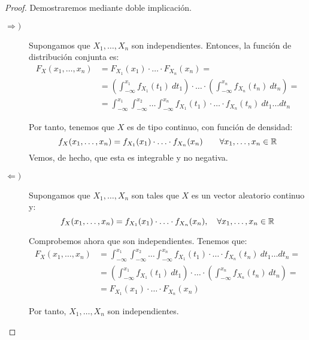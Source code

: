 \begin{proof}
    Demostraremos mediante doble implicación.
    \begin{description}
        \item[$\Longrightarrow)$] Supongamos que $X_1, \ldots, X_n$ son independientes. Entonces, la función de distribución conjunta es:
        \begin{align*}
            F_X(x_1, \ldots, x_n) &= F_{X_1}(x_1) \cdot \ldots \cdot F_{X_n}(x_n) 
            =\\&= \left(\int_{-\infty}^{x_1} f_{X_1}(t_1) \ dt_1\right) \cdot \dots \cdot \left(\int_{-\infty}^{x_n} f_{X_n}(t_n) \ dt_n\right)
            =\\&= \int_{-\infty}^{x_1} \int_{-\infty}^{x_2} \dots \int_{-\infty}^{x_n} f_{X_1}(t_1) \cdot \ldots \cdot f_{X_n}(t_n) \ dt_1 \dots dt_n
        \end{align*}

        Por tanto, tenemos que $X$ es de tipo continuo, con función de densidad:
        \begin{equation*}
            f_X(x_1, \ldots, x_n) = f_{X_1}(x_1) \cdot \ldots \cdot f_{X_n}(x_n)
            \qquad \forall x_1, \ldots, x_n \in \mathbb{R}
        \end{equation*}
        Vemos, de hecho, que esta es integrable y no negativa.

        \item[$\Longleftarrow)$] Supongamos que $X_1, \ldots, X_n$ son tales que $X$ es un vector aleatorio continuo y:
        \begin{equation*}
            f_X(x_1, \ldots, x_n) = f_{X_1}(x_1) \cdot \ldots \cdot f_{X_n}(x_n), \quad \forall x_1, \ldots, x_n \in \mathbb{R}
        \end{equation*}

        Comprobemos ahora que son independientes. Tenemos que:
        \begin{align*}
            F_X(x_1, \ldots, x_n) &= \int_{-\infty}^{x_1} \int_{-\infty}^{x_2} \dots \int_{-\infty}^{x_n} f_{X_1}(t_1) \cdot \ldots \cdot f_{X_n}(t_n) \ dt_1 \dots dt_n
            =\\&= \left(\int_{-\infty}^{x_1} f_{X_1}(t_1) \ dt_1\right) \cdot \dots \cdot \left(\int_{-\infty}^{x_n} f_{X_n}(t_n) \ dt_n\right)
            =\\&= F_{X_1}(x_1) \cdot \ldots \cdot F_{X_n}(x_n)
        \end{align*}

        Por tanto, $X_1, \ldots, X_n$ son independientes.
    \end{description}
\end{proof}

